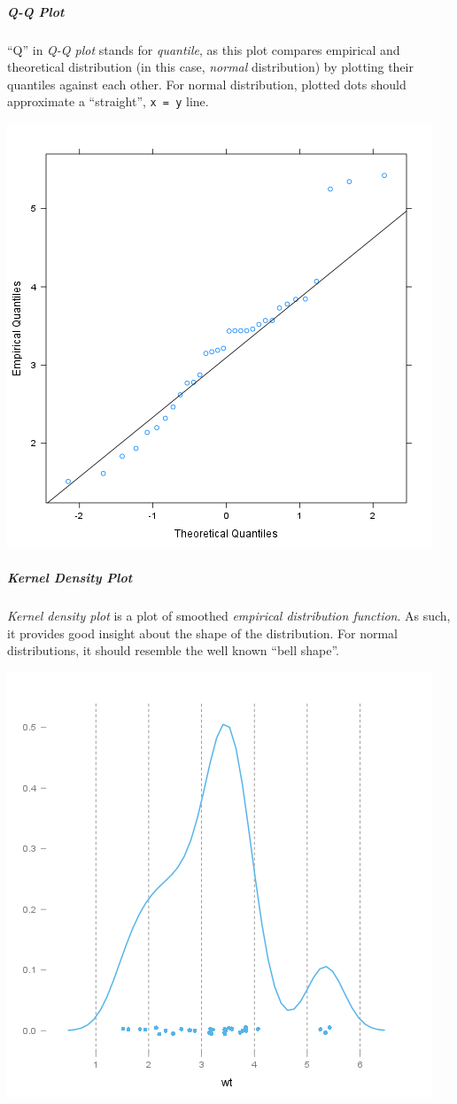 \documentclass[]{article}
\makeatletter
\def\maxwidth{\ifdim\Gin@nat@width>\linewidth\linewidth
\else\Gin@nat@width\fi}
\let\Oldincludegraphics\includegraphics
\renewcommand{\includegraphics}[1]{\Oldincludegraphics[width=\maxwidth]{#1}}
\makeatother
\begin{document}
\subparagraph{Q-Q Plot}

``Q'' in \emph{Q-Q plot} stands for \emph{quantile}, as this plot
compares empirical and theoretical distribution (in this case,
\emph{normal} distribution) by plotting their quantiles against each
other. For normal distribution, plotted dots should approximate a
``straight'', \texttt{x = y} line.

\href{975387b3193e28fb08a85f37cb17f87e-hires.png}{\includegraphics{975387b3193e28fb08a85f37cb17f87e.png}}

\subparagraph{Kernel Density Plot}

\emph{Kernel density plot} is a plot of smoothed \emph{empirical
distribution function}. As such, it provides good insight about the
shape of the distribution. For normal distributions, it should resemble
the well known ``bell shape''.

\href{1c20f2249107ddc2f8f5945197315e27-hires.png}{\includegraphics{1c20f2249107ddc2f8f5945197315e27.png}}
\end{document}
